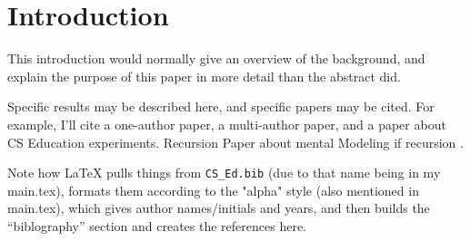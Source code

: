 \section{Introduction}

This introduction would normally give an overview of the background,
and explain the purpose of this paper in more detail than the abstract did.

Specific results may be described here, and specific papers may be cited.
For example, I'll cite a one-author paper\cite{DuBoulay:Notional86},
a multi-author paper\cite{TFK:Recursion18},
and a paper about CS Education experiments\cite{FTR:Design11}.
Recursion Paper about mental Modeling if recursion \cite{GSG:Recursion03}.

Note how LaTeX pulls things from {\tt CS\_Ed.bib} (due to that name being in my main.tex), 
formats them according to the "alpha" style (also mentioned in main.tex), which gives author names/initials and years,
and then builds the ``biblography'' section and creates the
references here.
